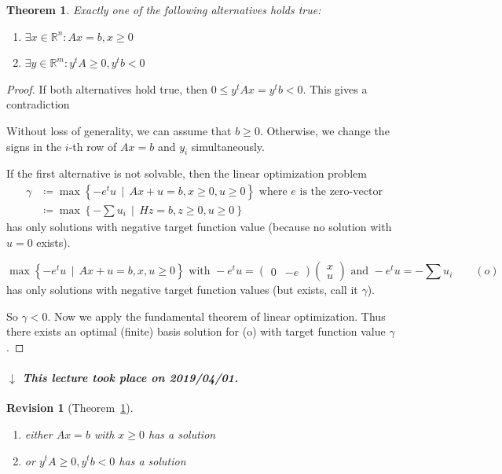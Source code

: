 \documentclass[a4paper]{article}
\newcounter{lecref}[subsection]
\numberwithin{lecref}{subsection}
\newtheorem{theorem}[lecref]{Theorem}
\newtheorem{revision}{Revision}
\newcommand{\SetDef}[2]{\left\{#1\,\mid\,#2\right\}}
\newcommand{\dateref}[1]{%
  \begin{mdframed}[backgroundcolor=gray!10,innerbottommargin=0pt,innertopmargin=0pt]
    \paragraph{\textit{$\downarrow$ This lecture took place on #1.}}%
  \end{mdframed}%
}
\begin{document}
\begin{theorem}
	\label{theorem:4.3}
	Exactly one of the following alternatives holds true:
	\begin{enumerate}
		\item $\exists x \in \mathbb R^n: Ax = b, x \geq 0$
		\item $\exists y \in \mathbb R^m: y^t A \geq 0, y^t b < 0$
	\end{enumerate}
\end{theorem}

\begin{proof}
	If both alternatives hold true, then $0 \leq y^tAx = y^tb < 0$. This gives a contradiction

	Without loss of generality, we can assume that $b \geq 0$. Otherwise, we change the signs in the $i$-th row of $Ax = b$ and $y_i$ simultaneously.

	If the first alternative is not solvable, then the linear optimization problem
	\begin{align*}
		\gamma &\coloneqq \max\SetDef{-e^tu}{Ax + u = b, x \geq 0, u \geq 0} \text{ where $e$ is the zero-vector} \\
			   &\coloneqq \max\SetDef{-\sum u_i}{Hz = b, z \geq 0, u \geq 0}
	\end{align*}
	has only solutions with negative target function value (because no solution with $u = 0$ exists).

	\[ \max\SetDef{-e^t u}{Ax + u = b, x, u \geq 0} \text{ with } -e^t u = \begin{pmatrix} 0 & -e \end{pmatrix} \begin{pmatrix} x \\ u \end{pmatrix} \text{ and } -e^tu = -\sum u_i \qquad (o) \]
	has only solutions with negative target function values (but exists, call it $\gamma$).

	So $\gamma < 0$. Now we apply the fundamental theorem of linear optimization.
	Thus there exists an optimal (finite) basis solution for (o) with target function value $\gamma$.
\end{proof}

\dateref{2019/04/01}

\begin{revision}[Theorem~\ref{theorem:4.3}]
	\begin{enumerate}
		\item either $Ax = b$ with $x \geq 0$ has a solution
		\item or $y^t A \geq 0, y^tb <0$ has a solution
	\end{enumerate}
\end{revision}
\end{document}
